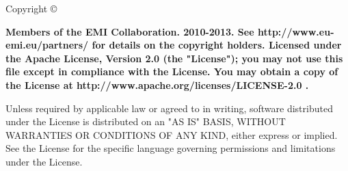 %
%







\vfill Copyright \copyright{\bf  
 Members of the EMI Collaboration. 2010-2013. See http://www.eu-emi.eu/partners/ for details on the copyright holders.
Licensed under the Apache License, Version 2.0 (the "License"); you may not use this file except in compliance with the License. You may obtain a copy of the License at http://www.apache.org/licenses/LICENSE-2.0 .

Unless required by applicable law or agreed to in writing, software distributed under the License is distributed on an "AS IS" BASIS,
 WITHOUT WARRANTIES OR CONDITIONS OF ANY KIND, either express or implied. See the License for the specific language governing permissions and limitations under the License.}
